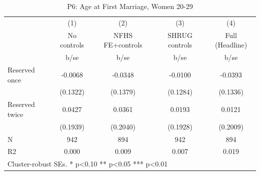 \begin{table}[htbp]\centering
\def\sym#1{\ifmmode^{#1}\else\(^{#1}\)\fi}
\caption{P6: Age at First Marriage, Women 20-29}
\begin{tabular}{l*{4}{c}}
\toprule
            &\multicolumn{1}{c}{(1)}   &\multicolumn{1}{c}{(2)}   &\multicolumn{1}{c}{(3)}   &\multicolumn{1}{c}{(4)}   \\
            & No controls   &NFHS FE+controls   &SHRUG controls   &Full (Headline)   \\
            &        b/se   &        b/se   &        b/se   &        b/se   \\
\midrule
Reserved once&     -0.0068   &     -0.0348   &     -0.0100   &     -0.0393   \\
            &    (0.1322)   &    (0.1379)   &    (0.1284)   &    (0.1336)   \\
Reserved twice&      0.0427   &      0.0361   &      0.0193   &      0.0121   \\
            &    (0.1939)   &    (0.2040)   &    (0.1928)   &    (0.2009)   \\
\midrule
N           &         942   &         894   &         942   &         894   \\
R2          &       0.000   &       0.009   &       0.007   &       0.019   \\
\bottomrule
\multicolumn{5}{l}{\footnotesize Cluster-robust SEs. * p<0.10 ** p<0.05 *** p<0.01}\\
\end{tabular}
\end{table}
